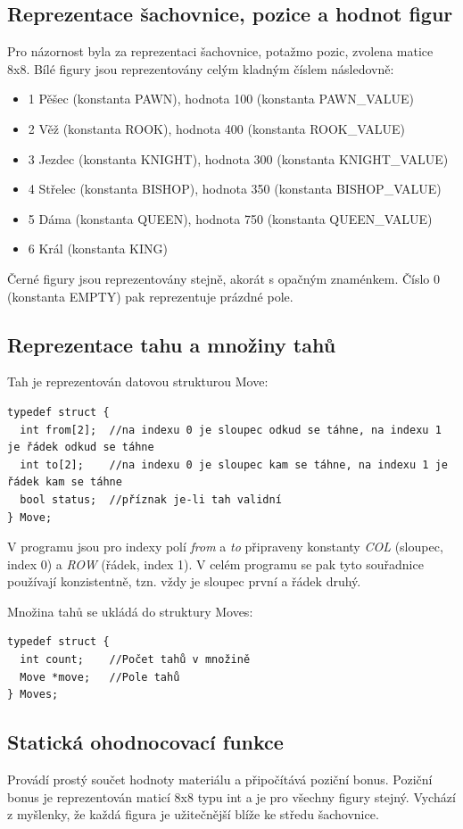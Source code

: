 \documentclass[11pt, titlepage]{article}
\begin{document}
\subsection{Reprezentace šachovnice, pozice a hodnot figur}
Pro názornost byla za reprezentaci šachovnice, potažmo pozic, zvolena matice 8x8. Bílé figury jsou reprezentovány celým kladným číslem následovně:
\begin{itemize}
	\item 1 Pěšec (konstanta PAWN), hodnota 100 (konstanta PAWN\_VALUE)
	\item 2 Věž (konstanta ROOK), hodnota 400 (konstanta ROOK\_VALUE)
	\item 3 Jezdec (konstanta KNIGHT), hodnota 300 (konstanta KNIGHT\_VALUE)
	\item 4 Střelec (konstanta BISHOP), hodnota 350 (konstanta BISHOP\_VALUE)
	\item 5 Dáma (konstanta QUEEN), hodnota 750 (konstanta QUEEN\_VALUE)
	\item 6 Král (konstanta KING)
\end{itemize}
Černé figury jsou reprezentovány stejně, akorát s opačným znaménkem. Číslo 0 (konstanta EMPTY) pak reprezentuje prázdné pole.

\subsection{Reprezentace tahu a množiny tahů}

Tah je reprezentován datovou strukturou Move:
\begin{verbatim}
typedef struct {
  int from[2];	//na indexu 0 je sloupec odkud se táhne, na indexu 1 je řádek odkud se táhne
  int to[2];	//na indexu 0 je sloupec kam se táhne, na indexu 1 je řádek kam se táhne
  bool status;	//příznak je-li tah validní
} Move;
\end{verbatim}

V programu jsou pro indexy polí {\it from} a {\it to} připraveny konstanty {\it COL} (sloupec, index 0) a {\it ROW} (řádek, index 1). V celém programu se pak tyto souřadnice používají konzistentně, tzn. vždy je sloupec první a řádek druhý.

Množina tahů se ukládá do struktury Moves:
\begin{verbatim}
typedef struct {
  int count;	//Počet tahů v množině
  Move *move;	//Pole tahů
} Moves;
\end{verbatim}

\subsection{Statická ohodnocovací funkce}
Provádí prostý součet hodnoty materiálu a připočítává poziční bonus. Poziční bonus je reprezentován maticí 8x8 typu int a je pro všechny figury stejný. Vychází z myšlenky, že každá figura je užitečnější blíže ke středu šachovnice.
\end{document}
